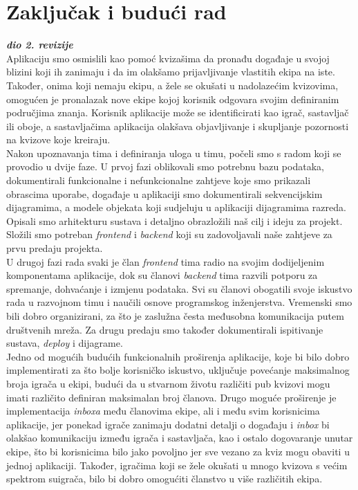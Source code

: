 \chapter{Zaključak i budući rad}
		
		\textbf{\textit{dio 2. revizije}}\\
		

		
		Aplikaciju smo osmislili kao pomoć kvizašima da pronađu događaje u svojoj blizini koji ih zanimaju i da im olakšamo prijavljivanje vlastitih ekipa na iste.
Također, onima koji nemaju ekipu, a žele se okušati u nadolazećim kvizovima, omogućen je pronalazak nove ekipe kojoj korisnik odgovara svojim definiranim područjima znanja. Korisnik aplikacije može se identificirati kao igrač, sastavljač ili oboje, a sastavljačima aplikacija olakšava objavljivanje i skupljanje pozornosti na kvizove koje kreiraju. \\
Nakon upoznavanja tima i definiranja uloga u timu, počeli smo s radom koji se provodio u dvije faze. U prvoj fazi oblikovali smo potrebnu bazu podataka, dokumentirali funkcionalne i nefunkcionalne zahtjeve koje smo prikazali obrascima uporabe, događaje u aplikaciji smo dokumentirali sekvencijskim dijagramima, a modele objekata koji sudjeluju u aplikaciji dijagramima razreda. Opisali smo arhitekturu sustava i detaljno obrazložili naš cilj i ideju za projekt. Složili smo potreban \textit{frontend} i \textit{backend} koji su zadovoljavali naše zahtjeve za prvu predaju projekta. \\
U drugoj fazi rada svaki je član \textit{frontend} tima radio na svojim dodijeljenim komponentama aplikacije, dok su članovi \textit{backend} tima razvili potporu za spremanje, dohvaćanje i izmjenu podataka. Svi su članovi obogatili svoje iskustvo rada u razvojnom timu i naučili osnove programskog inženjerstva. Vremenski smo bili dobro organizirani, za što je zaslužna česta međusobna komunikacija putem društvenih mreža. Za drugu predaju smo također dokumentirali ispitivanje sustava, \textit{deploy} i dijagrame.\\
Jedno od mogućih budućih funkcionalnih proširenja aplikacije, koje bi bilo dobro implementirati za što bolje korisničko iskustvo, uključuje povećanje maksimalnog broja igrača u ekipi, budući da u stvarnom životu različiti pub kvizovi mogu imati različito definiran maksimalan broj članova. Drugo moguće proširenje je implementacija\textit{ inboxa} među članovima ekipe, ali i među svim korisnicima aplikacije, jer ponekad igrače zanimaju dodatni detalji o događaju i\textit{ inbox} bi olakšao komunikaciju između igrača i sastavljača, kao i ostalo dogovaranje unutar ekipe, što bi korisnicima bilo jako povoljno jer sve vezano za kviz mogu obaviti u jednoj aplikaciji. Također, igračima koji se žele okušati u mnogo kvizova s većim spektrom suigrača, bilo bi dobro omogućiti članstvo u više različitih ekipa.\\


		
		\eject 